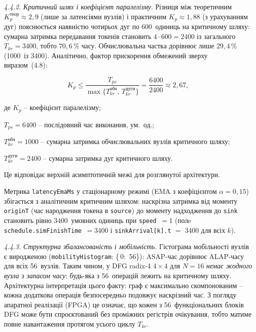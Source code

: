 \documentclass[
]{article}
\begin{document}
\emph{4.4.2. Критичний шлях і коефіцієнт паралелізму.} Різниця між
теоретичним \(K_{p}^{\text{теор}} \approx 2{,}9\) (лише за латенсіями
вузлів) і практичним \(K_{p} \approx 1{,}88\) (з урахуванням дуг)
пояснюється наявністю чотирьох дуг по 600~одиниць на критичному шляху:
сумарна затримка передавання токенів становить
\(4 \cdot 600 = 2400\) із загального
\(T_{kr} = 3400\), тобто \(70{,}6\,\%\) часу. Обчислювальна частка
дорівнює лише \(29{,}4\,\%\) (1000~із 3400). Аналітично, фактор
прискорення обмежений зверху виразом~(4.8):

\begin{equation}
\tag{4.8}\label{eq:Kp-upper}
K_{p} \leq \frac{T_{ps}}{\max\{T_{kr}^{\text{обч}},\, T_{kr}^{\text{дуги}}\}}
= \frac{6400}{2400} \approx 2{,}67,
\end{equation}

де \(K_{p}\) -- коефіцієнт паралелізму;

\(T_{ps} = 6400\) -- послідовний час виконання, ум.~од.;

\(T_{kr}^{\text{обч}} = 1000\) -- сумарна затримка обчислювальних вузлів критичного шляху;

\(T_{kr}^{\text{дуги}} = 2400\) -- сумарна затримка дуг критичного шляху.

Це відповідає верхній асимптотичній межі для розглянутої архітектури.

Метрика \texttt{latencyEmaMs} у стаціонарному режимі (EMA з коефіцієнтом
\(\alpha = 0{,}15\)) збігається з аналітичним критичним шляхом:
наскрізна затримка від моменту \texttt{originT} (час народження токена
в \texttt{source}) до моменту надходження до \texttt{sink} становить
рівно \(3400\)~умовних одиниць при \texttt{speed}~\(= 1\) (полe
\texttt{schedule.simFinishTime}~\(= 3400\) і \texttt{sinkArrival[k].t}
\(=\) \(3400\) для всіх \(k\)).

\emph{4.4.3. Структурна збалансованість і мобільність.} Гістограма
мобільності вузлів є виродженою (\texttt{mobilityHistogram}: \{\,0:~56\}):
ASAP-час дорівнює ALAP-часу для всіх 56~вузлів. Таким чином, у DFG
radix-4 \(4 \times 4\) для \(N = 16\) \emph{немає жодного вузла з
запасом часу}: будь-яка з 56~операцій лежить на критичному шляху.
Архітектурна інтерпретація цього факту: граф є максимально
скомпонованим -- кожна додаткова операція безпосередньо подовжує
наскрізний час. З погляду апаратної реалізації (FPGA) це означає, що
кожен з 56~функціональних блоків DFG може бути спроєктований без
проміжних регістрів очікування, тобто матиме повне навантаження
протягом усього циклу \(T_{kr}\).
\end{document}
